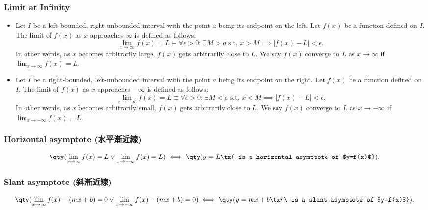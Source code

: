\documentclass[a4paper,12pt]{report}
\begin{document}
\subsubsection{Limit at Infinity}
\begin{itemize}
\item Let \(I\) be a left-bounded, right-unbounded interval with the point \(a\) being its endpoint on the left. Let \( f(x) \) be a function defined on \(I\). The limit of \( f(x) \) as \( x \) approaches \( \infty \) is defined as follows:
\[\lim_{x \to \infty} f(x) = L \equiv \forall \epsilon > 0: \, \exists M > a \text{\ s.t.\ } x > M \implies |f(x) - L| < \epsilon.\]
In other words, as \(x\) becomes arbitrarily large, \(f(x)\) gets arbitrarily close to \(L\). We say $f(x)$ converge to $L$ as $x\to\infty$ if $\lim_{x \to \infty} f(x) = L$.
\item Let \(I\) be a right-bounded, left-unbounded interval with the point \(a\) being its endpoint on the right. Let \( f(x) \) be a function defined on \(I\). The limit of \( f(x) \) as \( x \) approaches \( -\infty \) is defined as follows:
\[\lim_{x \to -\infty} f(x) = L \equiv \forall \epsilon > 0: \, \exists M < a \text{\ s.t.\ } x < M \implies |f(x) - L| < \epsilon.\]
In other words, as \(x\) becomes arbitrarily small, \(f(x)\) gets arbitrarily close to \(L\). We say $f(x)$ converge to $L$ as $x\to-\infty$ if $\lim_{x \to -\infty} f(x) = L$.
\end{itemize}
\subsubsection{Horizontal asymptote (水平漸近線)}
\[ \qty(\lim_{x \to \infty} f(x)=L \lor\lim_{x \to -\infty} f(x)=L) \iff \qty(y=L\tx{ is a horizontal asymptote of $y=f(x)$}).\]
\subsubsection{Slant asymptote (斜漸近線)}
\[ \qty(\lim_{x \to \infty} f(x)-(mx+b)=0 \lor\lim_{x \to -\infty} f(x)-(mx+b)=0) \iff \qty(y=mx+b\tx{\ is a slant asymptote of $y=f(x)$}).\]
\end{document}
